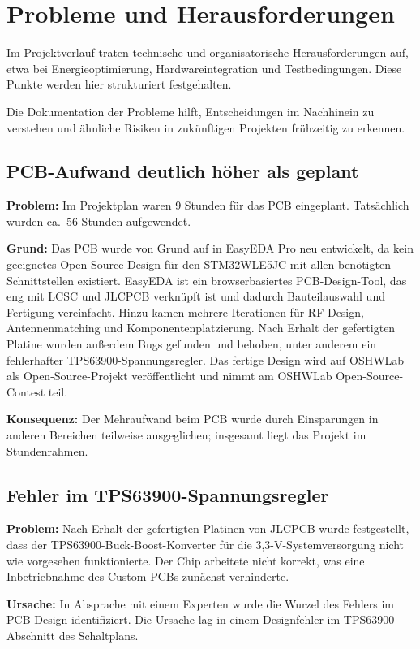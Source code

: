 \chapter{Probleme und Herausforderungen}
\label{cha:probleme}
Im Projektverlauf traten technische und organisatorische Herausforderungen auf, etwa bei Energieoptimierung, Hardwareintegration und Testbedingungen. Diese Punkte werden hier strukturiert festgehalten.

Die Dokumentation der Probleme hilft, Entscheidungen im Nachhinein zu verstehen und ähnliche Risiken in zukünftigen Projekten frühzeitig zu erkennen.

\section*{PCB-Aufwand deutlich höher als geplant}

\textbf{Problem:} Im Projektplan waren 9 Stunden für das PCB eingeplant. Tatsächlich wurden ca.\ 56 Stunden aufgewendet.

\textbf{Grund:} Das PCB wurde von Grund auf in EasyEDA Pro neu entwickelt, da kein geeignetes Open-Source-Design für den STM32WLE5JC mit allen benötigten Schnittstellen existiert. EasyEDA ist ein browserbasiertes PCB-Design-Tool, das eng mit LCSC und JLCPCB verknüpft ist und dadurch Bauteilauswahl und Fertigung vereinfacht. Hinzu kamen mehrere Iterationen für RF-Design, Antennenmatching und Komponentenplatzierung. Nach Erhalt der gefertigten Platine wurden außerdem Bugs gefunden und behoben, unter anderem ein fehlerhafter TPS63900-Spannungsregler. Das fertige Design wird auf OSHWLab als Open-Source-Projekt veröffentlicht und nimmt am OSHWLab Open-Source-Contest teil.

\textbf{Konsequenz:} Der Mehraufwand beim PCB wurde durch Einsparungen in anderen Bereichen teilweise ausgeglichen; insgesamt liegt das Projekt im Stundenrahmen.

\section*{Fehler im TPS63900-Spannungsregler}

\textbf{Problem:} Nach Erhalt der gefertigten Platinen von JLCPCB wurde festgestellt, dass der TPS63900-Buck-Boost-Konverter für die 3,3-V-Systemversorgung nicht wie vorgesehen funktionierte. Der Chip arbeitete nicht korrekt, was eine Inbetriebnahme des Custom PCBs zunächst verhinderte.

\textbf{Ursache:} In Absprache mit einem Experten wurde die Wurzel des Fehlers im PCB-Design identifiziert. Die Ursache lag in einem Designfehler im TPS63900-Abschnitt des Schaltplans.

